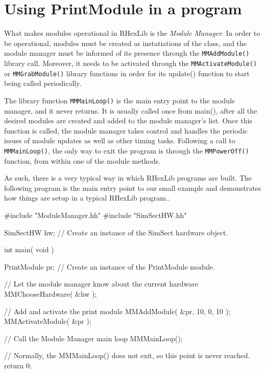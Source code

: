 \section{Using PrintModule in a program}
 \label{sec:together}

What makes modules operational in RHexLib is the {\em Module Manager}. In
order to be operational, modules must be created as instatiations of the
class, and the module manager must be informed of its presence through the
{\tt MMAddModule()} library call. Moreover, it needs to be activated through
the {\tt MMActivateModule()} or {\tt MMGrabModule()} library functions in
order for its update() function to start being called periodically.

The library function {\tt MMMainLoop()} is the main entry point to the
module manager, and it never returns. It is usually called once from main(),
after all the desired modules are created and added to the module manager's
list. Once this function is called, the module manager takes control and
handles the periodic issues of module updates as well as other timing tasks.
Following a call to {\tt MMMainLoop()}, the only way to exit the program is
through the {\tt MMPowerOff()} function, from within one of the module
methods.

As such, there is a very typical way in which RHexLib programs are
built. The following program is the main entry point to our small example
and demonstrates how things are setup in a typical RHexLib program..
 
\begin{codesegment}

#include "ModuleManager.hh"
#include "SimSectHW.hh"

SimSectHW hw; // Create an instance of the SimSect hardware object.

int main( void ) {

  PrintModule pr; // Create an instance of the PrintModule module.

  // Let the module manager know about the current hardware
  MMChooseHardware( &hw );

  // Add and activate the print module
  MMAddModule( &pr, 10, 0, 10 );
  MMActivateModule( &pr );

  // Call the Module Manager main loop
  MMMainLoop();

  // Normally, the MMMainLoop() does not exit, so this point is never reached.
  return 0;
}
\end{codesegment}

